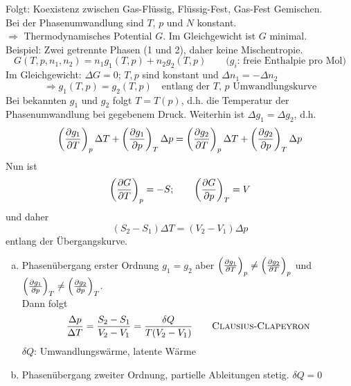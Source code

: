 Folgt: Koexistenz zwischen Gas-Flüssig, Flüssig-Fest, Gas-Fest Gemischen.\\
Bei der Phasenumwandlung sind $T$, $p$ und $N$ konstant. \\
$\Rightarrow$ Thermodynamisches Potential $G$. Im Gleichgewicht ist $G$ minimal. \\[\baselineskip]
Beispiel: Zwei getrennte Phasen (1 und 2), daher keine Mischentropie.
\begin{equation}
    G(T, p, n_1, n_2) = n_1 g_1(T, p) + n_2 g_2(T, p) \qquad \text{($g_i$: freie Enthalpie pro Mol)}
\end{equation}
Im Gleichgewicht: $\Delta G = 0$; $T, p$ sind konstant und $\Delta n_1 = - \Delta n_2$
\begin{equation}
    \Rightarrow g_1(T, p) = g_2(T, p) \quad \text{entlang der $T$, $p$ Umwandlungskurve}
\end{equation}
Bei bekannten $g_1$ und $g_2$ folgt $T = T(p)$, d.h. die Temperatur der Phasenumwandlung bei gegebenem Druck.
Weiterhin ist $\Delta g_1 = \Delta g_2$, d.h.
\begin{equation}
    \left( \frac{\partial g_1}{\partial T} \right)_{p} \Delta T + \left( \frac{\partial g_1}{\partial p} \right)_{T} \Delta p = \left( \frac{\partial g_2}{\partial T} \right)_{p} \Delta T + \left( \frac{\partial g_2}{\partial p} \right)_{T} \Delta p
\end{equation}
Nun ist
\begin{equation}
    \left( \frac{\partial G}{\partial T} \right)_{p} = - S; \qquad \left( \frac{\partial G}{\partial p} \right)_{T} = V
\end{equation}
und daher
\begin{equation}
    (S_2 - S_1) \Delta T = (V_2 - V_1) \Delta p
\end{equation}
entlang der Übergangskurve.

\begin{enumerate}[a)]
    \item Phasenübergang erster Ordnung $g_1 = g_2$ aber $\left( \frac{\partial g_1}{\partial T} \right)_{p} \neq \left( \frac{\partial g_2}{\partial T} \right)_{p}$ und $\left( \frac{\partial g_1}{\partial p} \right)_{T} \neq \left( \frac{\partial g_2}{\partial p} \right)_{T}$. \\
    Dann folgt
    \begin{equation}
        \frac{\Delta p}{\Delta T} = \frac{S_2 - S_1}{V_2 - V_1} = \frac{\delta Q}{T (V_2 - V_1)} \qquad \text{\textsc{Clausius}-\textsc{Clapeyron}}
    \end{equation}
    $\delta Q$: Umwandlungswärme, latente Wärme
    \item Phasenübergang zweiter Ordnung, partielle Ableitungen stetig. $\delta Q = 0$
\end{enumerate}
